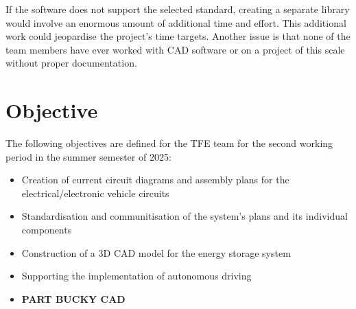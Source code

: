 If the software does not support the selected standard, creating a separate library would involve an enormous amount of additional time and effort. This additional work could jeopardise the project's time targets.
Another issue is that none of the team members have ever worked with CAD software or on a project of this scale without proper documentation.

\section*{Objective}
The following objectives are defined for the \glqq TFE team\grqq{} for the second working period in the summer semester of 2025:
\begin{itemize}
	\item %
	Creation of current circuit diagrams and assembly plans for the \newline  electrical/electronic vehicle circuits
	\item %
	Standardisation and communitisation of the system's plans and its individual components
	\item Construction of a 3D CAD model for the energy storage system
	\item Supporting the implementation of autonomous driving
	\item 
	\textbf{PART BUCKY CAD}
\end{itemize}
\clearpage

